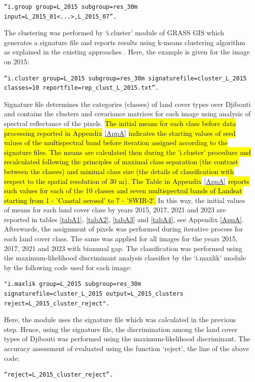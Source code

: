 \documentclass[jimaging,article,submit,pdftex,moreauthors]{Definitions/mdpi}
\begin{document}
\begin{verbatim}
“i.group group=L_2015 subgroup=res_30m 
input=L_2015_01<...>,L_2015_07”.
\end{verbatim}

The clustering was performed by ‘i.cluster’ module of GRASS GIS which generates a signature file and reports results using k-means clustering algorithm as explained in the existing approaches \cite{5930121,10430357,Lemenkova202315,5739741}. Here, the example is given for the image on 2015: 
\begin{verbatim}
“i.cluster group=L_2015 subgroup=res_30m signaturefile=cluster_L_2015 
classes=10 reportfile=rep_clust_L_2015.txt”. 
\end{verbatim}

Signature file determines the categories (classes) of land cover types over Djibouti and contains the clusters and covariance matrices for each image using analysis of spectral reflectance of the pixels. \hl{The initial means for each class before data processing reported in Appendix} \ref{AppA} \hl{indicates the starting values of seed values of the multispectral band before iteration assigned according to the signature files. The means are calculated then during the 'i.cluster' procedure and recalculated following the principles of maximal class separation (the contrast between the classes) and minimal class size (the details of classification with respect to the spatial resolution of 30 m). The Table in Appendix} \ref{AppA} \hl{reports such values for each of the 10 classes and seven multispectral bands of Landsat starting from 1 - 'Coastal aerosol' to 7 - 'SWIR-2'.} In this way, the initial values of means for each land cover class by years 2015, 2017, 2021 and 2023 are reported in tables \ref{tabA1}, \ref{tabA2}, \ref{tabA3} and \ref{tabA4}, see Appendix \ref{AppA}. Afterwards, the assignment of pixels was performed during iterative process for each land cover class. The same was applied for all images for the years 2015, 2017, 2021 and 2023 with biannual gap. The classification was performed using the maximum-likelihood discriminant analysis classifier by the ‘i.maxlik’ module \cite{Balha2022,CHOWDHURY2024100800,Lemenkova202323} by the following code used for each image: 

\begin{verbatim}
"i.maxlik group=L_2015 subgroup=res_30m 
signaturefile=cluster_L_2015 output=L_2015_clusters 
reject=L_2015_cluster_reject".
\end{verbatim}
 Here, the module uses the signature file which was calculated in the previous step. Hence, using the signature file, the discrimination among the land cover types of Djibouti was performed using the maximum-likelihood discriminant. The accuracy assessment of evaluated using the function ‘reject’, the line of the above code: 
 \begin{verbatim}
“reject=L_2015_cluster_reject”.
\end{verbatim}
\end{document}
